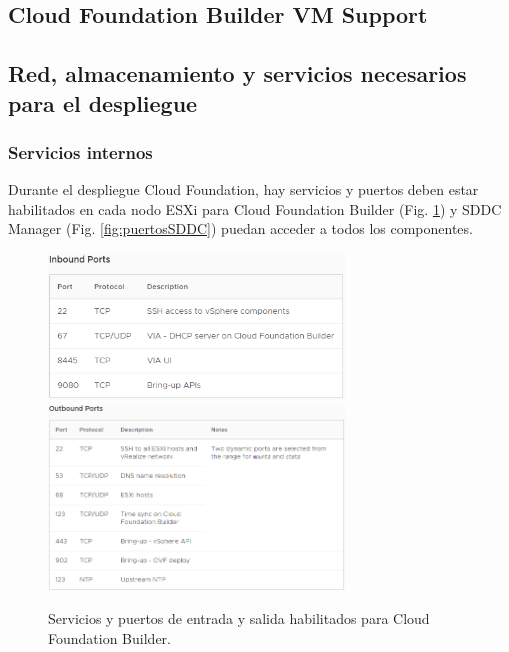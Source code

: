 \subsection{Cloud Foundation Builder VM Support}
\label{subsec:cloudBuilder}


\subsection{Red, almacenamiento y servicios necesarios para el despliegue}

\subsubsection{Servicios internos}
\label{subsubsec:servInterno}
Durante el despliegue Cloud Foundation, hay servicios y puertos deben estar habilitados en cada nodo ESXi para Cloud Foundation Builder (Fig. \ref{fig:puertosCB}) y SDDC Manager (Fig. \ref{fig:puertosSDDC}) puedan acceder a todos los componentes.

\iffalse
\begin{figure}[h!]
  \centering
  \includegraphics[width=0.7\textwidth]{imaxes/conceptosPrevios/puertosentradaCB.png}
  \includegraphics[width=0.7\textwidth]{imaxes/conceptosPrevios/puertossalidaCB.png}
  \caption{Servicios y puertos de entrada y salida habilitados para Cloud Foundation Builder.}
  \label{fig:puertosCB}
\end{figure}


